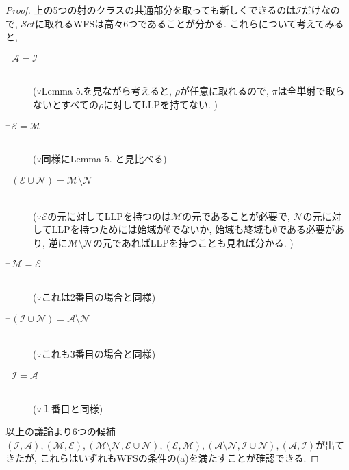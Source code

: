 \documentclass[. /main]{subfiles}
\theoremstyle{definition}
\begin{document}
\begin{proof}
上の5つの射のクラスの共通部分を取っても新しくできるのは$\mathcal{I}$だけなので, $\mathcal{S}et$に取れるWFSは高々6つであることが分かる. これらについて考えてみると, 
\begin{description}
\item [${}^{\perp}\mathcal{A}=\mathcal{I}$] \mbox{}\\
        ($\because$Lemma 5.を見ながら考えると, $\rho$が任意に取れるので, $\pi$は全単射で取らないとすべての$\rho$に対してLLPを持てない. )
\item [${}^{\perp}\mathcal{E}=\mathcal{M}$]\mbox{}\\
        ($\because$同様にLemma 5. と見比べる)
\item [${}^{\perp}(\mathcal{E} \cup \mathcal{N})=\mathcal{M} \setminus \mathcal{N}$]\mbox{}\\
        ($\because$$\mathcal{E}$の元に対してLLPを持つのは$\mathcal{M}$の元であることが必要で, $\mathcal{N}$の元に対してLLPを持つためには始域が$\emptyset$でないか, 始域も終域も$\emptyset$である必要があり, 逆に$\mathcal{M} \setminus \mathcal{N}$の元であればLLPを持つことも見れば分かる. )
\item [${}^{\perp}\mathcal{M}=\mathcal{E}$]\mbox{}\\
        ($\because$これは2番目の場合と同様)
\item [${}^{\perp}(\mathcal{I} \cup \mathcal{N})=\mathcal{A} \setminus \mathcal{N}$]\mbox{}\\
        ($\because$これも3番目の場合と同様)
\item [${}^{\perp}\mathcal{I}=\mathcal{A}$]\mbox{}\\
        ($\because$１番目と同様)
\end{description}
以上の議論より6つの候補$(\mathcal{I},  \mathcal{A}),  (\mathcal{M},  \mathcal{E}),  (\mathcal{M} \setminus \mathcal{N},  \mathcal{E} \cup \mathcal{N}),  (\mathcal{E},  \mathcal{M}),  (\mathcal{A} \setminus \mathcal{N},  \mathcal{I} \cup \mathcal{N}),  (\mathcal{A},  \mathcal{I})$が出てきたが, これらはいずれもWFSの条件の(a)を満たすことが確認できる. 
\end{proof}
\end{document}
